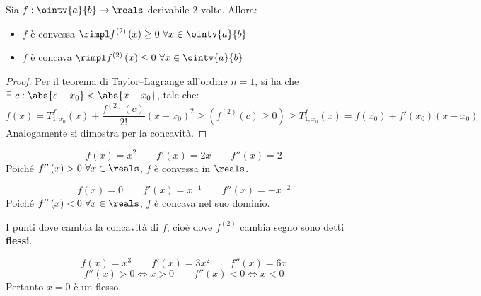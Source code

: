 \begin{theorem}
  Sia $f:\ointv{a}{b}\to\reals$ derivabile 2 volte. Allora:
  \begin{itemize}
    \item $f$ è convessa $\rimpl f^{\left(2\right)}\left(x\right)\ge0\ \forall x\in\ointv{a}{b}$
    \item $f$ è concava $\rimpl f^{\left(2\right)}\left(x\right)\le0\ \forall x\in\ointv{a}{b}$
  \end{itemize}
\end{theorem}
\begin{proof}
  Per il teorema di Taylor--Lagrange all'ordine $n=1$, si ha che $\exists\ c:\abs{c-x_0}<\abs{x-x_0}$, tale che:
  $$f\left(x\right)=T_{1,x_0}^f\left(x\right)+\frac{f^{\left(2\right)}\left(c\right)}{2!}\left(x-x_0\right)^{2}\ge \left(f^{\left(2\right)}\left(c\right)\ge0\right)\ge T_{1,x_0}^f\left(x\right) =f\left(x_0\right)+f'\left(x_0\right)\left(x-x_0\right)$$
  Analogamente si dimostra per la concavità.
\end{proof}

\begin{example}
  $$f\left( x \right)=x^2\qquad f'\left( x \right)=2x\qquad f''\left( x \right)=2$$
  Poiché $f''\left( x \right)>0\ \forall x\in\reals$, $f$ è convessa in $\reals$.
\end{example}

\begin{example}
  $$f\left( x \right)=0\qquad f'\left( x \right)=x^{-1}\qquad f''\left( x \right)=-x^{-2}$$
  Poiché $f''\left( x \right)<0\ \forall x\in\reals$, $f$ è concava nel suo dominio. 
\end{example}

\begin{definition}[Flessi]
  I punti dove cambia la concavità di $f$, cioè dove $f^{\left(2\right)}$ cambia segno sono detti \textbf{flessi}.
\end{definition}

\begin{example}
  $$f\left( x \right)=x^3\qquad f'\left( x \right)=3x^2\qquad f''\left( x \right)=6x$$
  $$f''\left( x \right)>0\iff x>0\qquad f''\left( x \right)<0\iff x<0$$
  Pertanto $x=0$ è un flesso.
\end{example}
